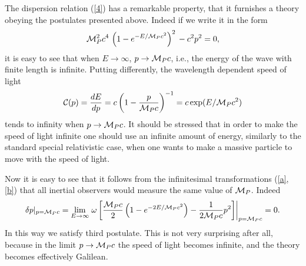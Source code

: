 \documentclass [11pt] {article}
\begin{document}
 The dispersion relation (\ref{4}) has a remarkable property, that it
 furnishes a theory
  obeying the postulates presented above. Indeed if we write it in the form
\begin{equation}\label{5}
 {\cal M}^2_P c^4\,\left(1- e^{-E/{\cal M}_P
 c^2}\right)^2\,
  -c^2p^2 =0,
\end{equation}
  it is easy to see that when $E\rightarrow\infty$,
  $p\rightarrow {\cal M}_P c$, i.e., the energy of the wave with
  finite length is infinite. Putting differently, the wavelength dependent
  speed of
  light
\begin{equation}\label{6}
 {\cal C}(p) = \frac{dE}{dp} = c \left(1 - \frac{p}{{\cal M}_P c}\right)^{-1} = c\exp(E/{\cal M}_P c^2)
\end{equation}
tends to infinity when $p\rightarrow {\cal M}_P c$. It should be stressed 
that in order to make the speed of light infinite one should use an 
infinite amount of energy, similarly to the standard special relativistic 
case, when  one wants to make a massive particle to move with the speed of 
light. 





Now it is easy to see that it follows from the infinitesimal
transformations (\ref{a}, \ref{b}) that all inertial observers
would measure the same value of ${\cal M}_P$. Indeed $$ \delta
p|_{p={\cal M}_P c} = \lim_{E \rightarrow \infty} \left.
\omega\left[\frac{{\cal M}_P c}{2} \left( 1 - e^{-2 E/{\cal M}_P
 c^2}\right) - \frac{1}{2{\cal M}_P c} p^2\right]\right|_{p={\cal M}_P
 c}=0.$$ In this way we satisfy third
 postulate. This is not very surprising after all, because in the limit 
$p\rightarrow {\cal M}_P c$ the speed of light becomes infinite, and the 
theory becomes effectively Galilean. 
\end{document}
